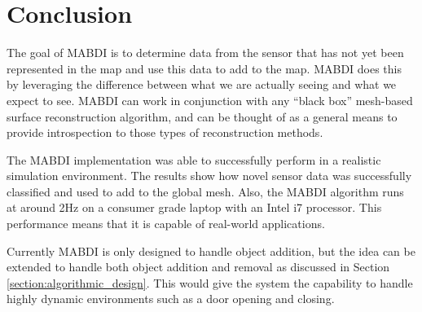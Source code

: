 \chapter{Conclusion} \label{chapter:conclusion}

The goal of MABDI is to determine data from the sensor that has not yet been
represented in the map and use this data to add to the map. MABDI does this by
leveraging the difference between what we are actually seeing and what we expect
to see. MABDI can work in conjunction with any ``black box'' mesh-based surface
reconstruction algorithm, and can be thought of as a general means to provide
introspection to those types of reconstruction methods.

 The MABDI implementation was able to successfully perform in a realistic
 simulation environment. The results show how novel sensor data was
 successfully classified and used to add to the global mesh. Also, the MABDI
 algorithm runs at around 2Hz on a consumer grade laptop with an Intel i7
 processor. This performance means that it is capable of real-world
 applications.

 Currently MABDI is only designed to handle object addition, but the idea can be
 extended to handle both object addition and removal as discussed in Section
 \ref{section:algorithmic_design}. This would give the system the
 capability to handle highly dynamic environments such as a door opening and
 closing.
